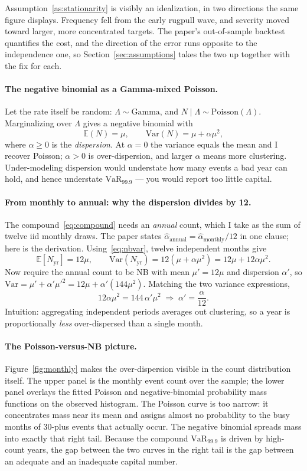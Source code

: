 \documentclass[11pt]{article}
\theoremstyle{definition}
\theoremstyle{remark}
\theoremstyle{definition}
\newcommand{\E}{\mathbb{E}}
\newcommand{\Var}{\mathrm{Var}}
\newcommand{\VaR}{\mathrm{VaR}}
\newcommand{\1}{\mathbf{1}}
\begin{document}
\noindent Assumption~\ref{as:stationarity} is visibly an idealization, in two
directions the same figure displays. Frequency fell from the early rugpull wave,
and severity moved toward larger, more concentrated targets. The paper's
out-of-sample backtest quantifies the cost, and the direction of the error runs
opposite to the independence one, so Section~\ref{sec:assumptions} takes the two
up together with the fix for each.

\paragraph{The negative binomial as a Gamma-mixed Poisson.}
Let the rate itself be random: $\Lambda\sim\text{Gamma}$, and
$N\mid\Lambda\sim\text{Poisson}(\Lambda)$. Marginalizing over $\Lambda$ gives a
negative binomial with
\begin{equation}\label{eq:nbvar}
\E(N)=\mu, \qquad \Var(N)=\mu+\alpha\mu^2,
\end{equation}
where $\alpha\ge 0$ is the \emph{dispersion}. At $\alpha=0$ the variance equals
the mean and I recover Poisson; $\alpha>0$ is over-dispersion, and larger
$\alpha$ means more clustering. Under-modeling dispersion would understate how
many events a bad year can hold, and hence understate $\VaR_{99.9}$ --- you
would report too little capital.

\paragraph{From monthly to annual: why the dispersion divides by 12.}
The compound~\eqref{eq:compound} needs an \emph{annual} count, which I take as
the sum of twelve iid monthly draws. The paper states
$\hat\alpha_{\text{annual}}=\hat\alpha_{\text{monthly}}/12$ in one clause; here
is the derivation. Using~\eqref{eq:nbvar}, twelve independent months give
\[
\E[N_{\text{yr}}]=12\mu, \qquad
\Var(N_{\text{yr}})=12(\mu+\alpha\mu^2)=12\mu+12\alpha\mu^2.
\]
Now require the annual count to be NB with mean $\mu'=12\mu$ and dispersion
$\alpha'$, so $\Var=\mu'+\alpha'\mu'^2=12\mu+\alpha'(144\mu^2)$. Matching the
two variance expressions,
\[
12\alpha\mu^2 = 144\,\alpha'\mu^2 \;\Longrightarrow\; \alpha'=\frac{\alpha}{12}.
\]
Intuition: aggregating independent periods averages out clustering, so a year
is proportionally \emph{less} over-dispersed than a single month.

\paragraph{The Poisson-versus-NB picture.}
Figure~\ref{fig:monthly} makes the over-dispersion visible in the count
distribution itself. The upper panel is the monthly event count over the sample;
the lower panel overlays the fitted Poisson and negative-binomial probability
mass functions on the observed histogram. The Poisson curve is too narrow: it
concentrates mass near its mean and assigns almost no probability to the busy
months of 30-plus events that actually occur. The negative binomial spreads mass
into exactly that right tail. Because the compound $\VaR_{99.9}$ is driven by
high-count years, the gap between the two curves in the right tail is the gap
between an adequate and an inadequate capital number.
\end{document}
